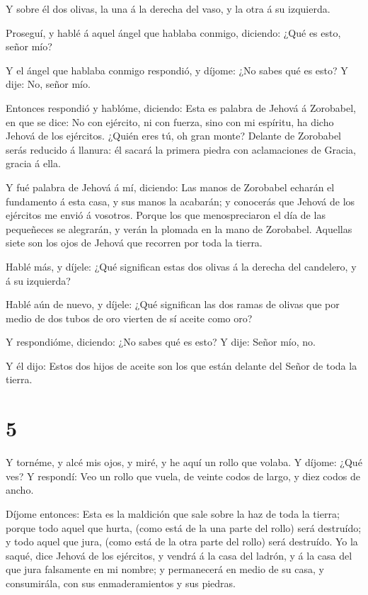  Y sobre él dos olivas, la una á la derecha del vaso, y la
otra á su izquierda.

 Proseguí, y hablé á aquel ángel que hablaba conmigo,
diciendo: ¿Qué es esto, señor mío?

 Y el ángel que hablaba conmigo respondió, y díjome: ¿No
sabes qué es esto? Y dije: No, señor mío.

 Entonces respondió y hablóme, diciendo: Esta es palabra de
Jehová á Zorobabel, en que se dice: No con ejército, ni con fuerza, sino
con mi espíritu, ha dicho Jehová de los ejércitos.  ¿Quién
eres tú, oh gran monte? Delante de Zorobabel serás reducido á llanura:
él sacará la primera piedra con aclamaciones de Gracia, gracia á ella.

 Y fué palabra de Jehová á mí, diciendo:  Las
manos de Zorobabel echarán el fundamento á esta casa, y sus manos la
acabarán; y conocerás que Jehová de los ejércitos me envió á vosotros.
 Porque los que menospreciaron el día de las pequeñeces se
alegrarán, y verán la plomada en la mano de Zorobabel. Aquellas siete
son los ojos de Jehová que recorren por toda la tierra.

 Hablé más, y díjele: ¿Qué significan estas dos olivas á la
derecha del candelero, y á su izquierda?

 Hablé aún de nuevo, y díjele: ¿Qué significan las dos
ramas de olivas que por medio de dos tubos de oro vierten de sí aceite
como oro?

 Y respondióme, diciendo: ¿No sabes qué es esto? Y dije:
Señor mío, no.

 Y él dijo: Estos dos hijos de aceite son los que están
delante del Señor de toda la tierra.

\hypertarget{section-4}{%
\section{5}\label{section-4}}

 Y tornéme, y alcé mis ojos, y miré, y he aquí un rollo que
volaba.  Y díjome: ¿Qué ves? Y respondí: Veo un rollo que
vuela, de veinte codos de largo, y diez codos de ancho.

 Díjome entonces: Esta es la maldición que sale sobre la haz
de toda la tierra; porque todo aquel que hurta, (como está de la una
parte del rollo) será destruído; y todo aquel que jura, (como está de la
otra parte del rollo) será destruído.  Yo la saqué, dice
Jehová de los ejércitos, y vendrá á la casa del ladrón, y á la casa del
que jura falsamente en mi nombre; y permanecerá en medio de su casa, y
consumirála, con sus enmaderamientos y sus piedras.

